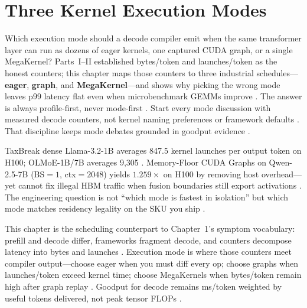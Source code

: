 \chapter{Three Kernel Execution Modes}
\label{chap:ch12}

Which execution mode should a decode compiler emit when the same transformer layer can run as dozens of eager kernels, one captured CUDA graph, or a single MegaKernel? Parts~I--II established bytes/token and launches/token as the honest counters; this chapter maps those counters to three industrial schedules---\textbf{eager}, \textbf{graph}, and \textbf{MegaKernel}---and shows why picking the wrong mode leaves p99 latency flat even when microbenchmark GEMMs improve \citep{patel2025llminference,taxbreak2026,memoryfloor2026}. The answer is always profile-first, never mode-first \citep{patel2025llminference,memoryfloor2026,taxbreak2026,yirage2026,chen2020compilerbasedhardw,amd2024xdna,semianalysis2024tma,nvidia2024cudagraphs,dao2022flashattention,kwon2023vllm,liu2024deepseekv3,dlbook,dao2023flashdecoding,nvidia2022hopper,amd2024aie}. Start every mode discussion with measured decode counters, not kernel naming preferences or framework defaults \citep{taxbreak2026,memoryfloor2026,patel2025llminference,yirage2026,nvidia2024cudagraphs,chen2020compilerbasedhardw,amd2024xdna,semianalysis2024tma,dao2022flashattention,kwon2023vllm,liu2024deepseekv3,dlbook,dao2023flashdecoding,nvidia2022hopper,amd2024aie}. That discipline keeps mode debates grounded in goodput evidence \citep{patel2025llminference,taxbreak2026,memoryfloor2026,dlbook}.

TaxBreak dense Llama-3.2-1B averages 847.5 kernel launches per output token on H100; OLMoE-1B/7B averages 9,305 \citep{taxbreak2026}. Memory-Floor CUDA Graphs on Qwen-2.5-7B (BS${=}1$, ctx${=}2048$) yields $1.259\times$ on H100 by removing host overhead---yet cannot fix illegal HBM traffic when fusion boundaries still export activations \citep{memoryfloor2026,nvidia2024cudagraphs}. The engineering question is not ``which mode is fastest in isolation'' but which mode matches residency legality on the SKU you ship \citep{yirage2026,chen2020compilerbasedhardw,amd2024xdna}.

This chapter is the scheduling counterpart to Chapter~1's symptom vocabulary: prefill and decode differ, frameworks fragment decode, and counters decompose latency into bytes and launches \citep{patel2025llminference,taxbreak2026,memoryfloor2026}. Execution mode is where those counters meet compiler output---choose eager when you must diff every op; choose graphs when launches/token exceed kernel time; choose MegaKernels when bytes/token remain high after graph replay \citep{nvidia2024cudagraphs,yirage2026,dao2022flashattention,kwon2023vllm}. Goodput for decode remains ms/token weighted by useful tokens delivered, not peak tensor FLOPs \citep{dlbook,patel2025llminference,semianalysis2024tma}.

